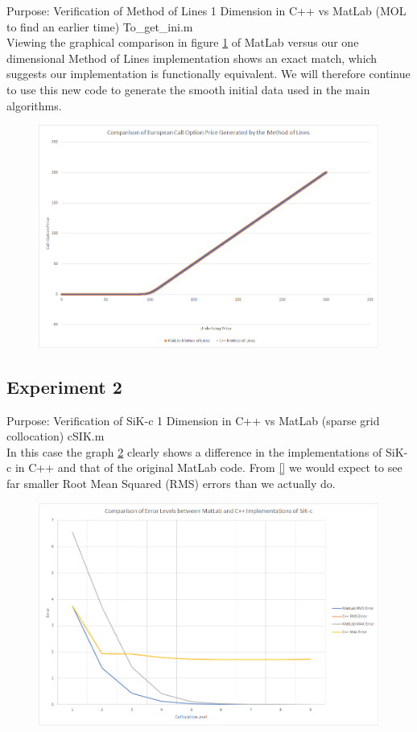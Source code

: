 \documentclass[a4paper]{amsart}
\begin{document}
Purpose: Verification of Method of Lines 1 Dimension in C++ vs MatLab (MOL to find an earlier time) To\_get\_ini.m\\

Viewing the graphical comparison in figure \ref{fig:cppExp1} of MatLab versus our one dimensional Method of Lines implementation shows an exact match, which suggests our implementation is functionally equivalent. We will therefore continue to use this new code to generate the smooth initial data used in the main algorithms.

\begin{figure}[h]
\centering
\includegraphics[scale=0.3]{cppExp1-chart.png}
\caption {}
\label {fig:cppExp1}
\end{figure}

\subsection{Experiment 2}\label{cppExp2}

Purpose: Verification of SiK-c 1 Dimension in C++ vs MatLab (sparse grid collocation) cSIK.m\\

In this case the graph \ref{fig:cppExp2} clearly shows a difference in the implementations of SiK-c in C++ and that of the original MatLab code. From \ref{} we would expect to see far smaller Root Mean Squared (RMS) errors than we actually do.

\begin{figure}[h]
\centering
\includegraphics[scale=0.3]{cppExp2-chart.png}
\caption {}
\label {fig:cppExp2}
\end{figure}
\end{document}
